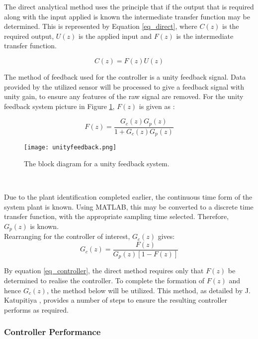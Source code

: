 The direct analytical method uses the principle that if the output that is required along with the input applied is known the intermediate transfer function may be determined. This is represented by Equation \ref{eq_direct}, where $C(z)$ is the required output, $U(z)$ is the applied input and $F(z)$ is the intermediate transfer function.

\begin{equation}
\label{eq_direct}
C(z) = F(z)U(z)
\end{equation}

The method of feedback used for the controller is a unity feedback signal. Data provided by the utilized sensor will be processed to give a feedback signal with unity gain, to ensure any features of the raw signal are removed. For the unity feedback system picture in Figure \ref{fig:unityfeedback}, $F(z)$ is given as \cite{UNSW}:

\begin{equation}
F(z) = \frac{G_c(z)G_p(z)}{1+G_c(z)G_p(z)}
\end{equation}

\begin{figure}[!htb]
	\centering
	\texttt{[image: unityfeedback.png]}
	\caption[Unity feedback system.]{The block diagram for a unity feedback system. \cite{UNSW}}
	\label{fig:unityfeedback}
\end{figure} 
\FloatBarrier

Due to the plant identification completed earlier, the continuous time form of the system plant is known. Using MATLAB, this may be converted to a discrete time transfer function, with the appropriate sampling time selected. Therefore, $G_p(z)$ is known.\\

Rearranging for the controller of interest, $G_c(z)$ gives:
\begin{equation}
\label{eq_controller}
G_c(z) = \frac{F(z)}{G_p(z)[1-F(z)]}
\end{equation}

By equation \ref{eq_controller}, the direct method requires only that $F(z)$ be determined to realise the controller. To complete the formation of $F(z)$ and hence $G_c(z)$, the method below will be utilized. This method, as detailed by J. Katupitiya \cite{UNSW}, provides a number of steps to ensure the resulting controller performs as required.\\

\subsubsection{Controller Performance}

